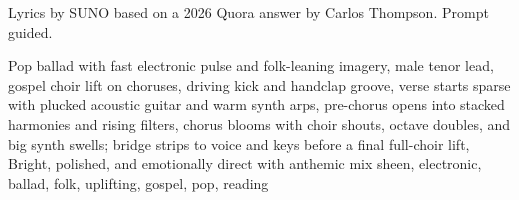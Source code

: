 
\begin{notes}
Lyrics by SUNO based on a 2026 Quora answer by Carlos Thompson. Prompt guided.
\end{notes}
\begin{style}
Pop ballad with fast electronic pulse and folk-leaning imagery, male tenor lead, gospel choir lift on choruses, driving kick and handclap groove, verse starts sparse with plucked acoustic guitar and warm synth arps, pre-chorus opens into stacked harmonies and rising filters, chorus blooms with choir shouts, octave doubles, and big synth swells; bridge strips to voice and keys before a final full-choir lift, Bright, polished, and emotionally direct with anthemic mix sheen, electronic, ballad, folk, uplifting, gospel, pop, reading
\end{style}
